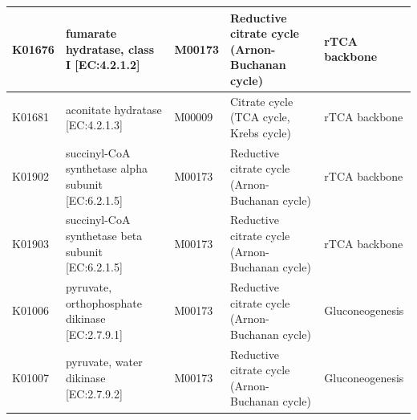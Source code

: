 {\begin{longtable}{|l|p{4.8cm}|l|p{4.2cm}|p{2.6cm}|}
K01676 & fumarate hydratase, class I [EC:4.2.1.2] & M00173 & Reductive citrate cycle (Arnon-Buchanan cycle) & rTCA backbone \\ \hline
K01681 & aconitate hydratase [EC:4.2.1.3] & M00009 & Citrate cycle (TCA cycle, Krebs cycle) & rTCA backbone \\ \hline
K01902 & succinyl-CoA synthetase alpha subunit [EC:6.2.1.5] & M00173 & Reductive citrate cycle (Arnon-Buchanan cycle) & rTCA backbone \\ \hline
K01903 & succinyl-CoA synthetase beta subunit [EC:6.2.1.5] & M00173 & Reductive citrate cycle (Arnon-Buchanan cycle) & rTCA backbone \\ \hline
K01006 & pyruvate, orthophosphate dikinase [EC:2.7.9.1] & M00173 & Reductive citrate cycle (Arnon-Buchanan cycle) & Gluconeogenesis \\ \hline
K01007 & pyruvate, water dikinase [EC:2.7.9.2] & M00173 & Reductive citrate cycle (Arnon-Buchanan cycle) & Gluconeogenesis \\ \hline
\end{longtable}
}

